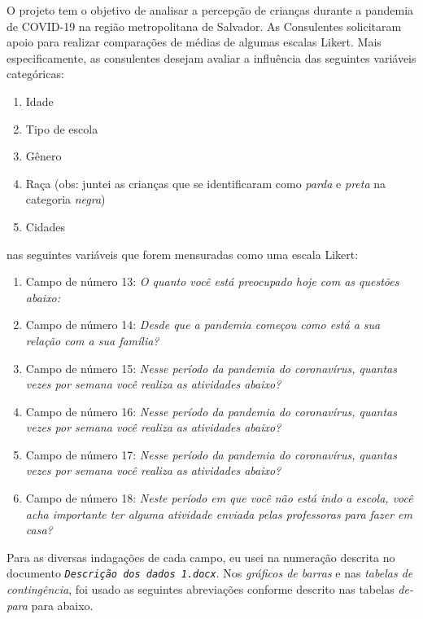 \documentclass[]{article}
\providecommand{\tightlist}{%
  \setlength{\itemsep}{0pt}\setlength{\parskip}{0pt}}
\begin{document}
O projeto tem o objetivo de analisar a percepção de crianças durante a pandemia de COVID-19 na região metropolitana de Salvador. As Consulentes solicitaram apoio para realizar comparações de médias de algumas escalas Likert. Mais especificamente, as consulentes desejam avaliar a influência das seguintes variáveis categóricas:

\begin{enumerate}
\def\labelenumi{\roman{enumi}.}
\tightlist
\item
  Idade
\item
  Tipo de escola
\item
  Gênero
\item
  Raça (obs: juntei as crianças que se identificaram como \emph{parda} e \emph{preta} na categoria \emph{negra})
\item
  Cidades
\end{enumerate}

nas seguintes variáveis que forem mensuradas como uma escala Likert:

\begin{enumerate}
\def\labelenumi{\roman{enumi}.}
\tightlist
\item
  Campo de número 13: \emph{O quanto você está preocupado hoje com as questões abaixo:}
\item
  Campo de número 14: \emph{Desde que a pandemia começou como está a sua relação com a sua família?}
\item
  Campo de número 15: \emph{Nesse período da pandemia do coronavírus, quantas vezes por semana você realiza as atividades abaixo?}
\item
  Campo de número 16: \emph{Nesse período da pandemia do coronavírus, quantas vezes por semana você realiza as atividades abaixo?}
\item
  Campo de número 17: \emph{Nesse período da pandemia do coronavírus, quantas vezes por semana você realiza as atividades abaixo?}
\item
  Campo de número 18: \emph{Neste período em que você não está indo a escola, você acha importante ter alguma atividade enviada pelas professoras para fazer em casa?}
\end{enumerate}

Para as diversas indagações de cada campo, eu usei na numeração descrita no documento \emph{\texttt{Descrição\ dos\ dados\ 1.docx}}. Nos \emph{gráficos de barras} e nas \emph{tabelas de contingência}, foi usado as seguintes abreviações conforme descrito nas tabelas \emph{de-para} para abaixo.
\end{document}
